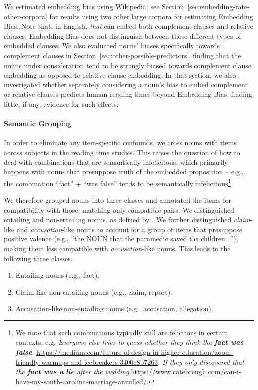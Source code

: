 We estimated embedding bias using Wikipedia; see Section~\ref{sec:embedding-rate-other-corpora} for results using two other large corpora for estimating Embedding Bias.
Note that, in English, \emph{that} can embed both complement clauses and relative clauses; Embedding Bias does not distinguish between those different types of embedded clauses.
We also evaluated nouns' biases specifically towards complement clauses in Section~\ref{sec:other-possible-predictors}, finding that the nouns under consideration tend to be strongly biased towards complement clause embedding as opposed to relative clause embedding.
In that section, we also investigated whether separately considering a noun's bias to embed complement or relative clauses predicts human reading times beyond Embedding Bias, finding little, if any, evidence for such effects.

\paragraph{Semantic Grouping}
In order to eliminate any item-specific confounds, we cross nouns with items across subjects in the reading time studies.
This raises the question of how to deal with combinations that are semantically infelicitous, which primarily happens with nouns that presuppose truth of the embedded proposition -- e.g., the combination ``fact'' + ``was false'' tends to be semantically infelicitous\footnote{We note that such combinations typically still are felicitous in certain contexts, e.g. \textit{Everyone else tries to guess whether they think the \textbf{fact was false}.} \url{https://medium.com/future-of-design-in-higher-education/zoom-friendly-warmups-and-icebreakers-3400c8b7263}; \textit{If they only discovered that the \textbf{fact was a lie} after the wedding} \url{https://www.catebrough.com/can-i-have-my-south-carolina-marriage-annulled/}.}

We therefore grouped nouns into three classes and annotated the items for compatibility with those, matching only compatible pairs.
We distinguished entailing and non-entailing nouns, as defined by \cite{huddleston2002the}. We further distinguished \textit{claim}-like and \textit{accusation}-like nouns to account for a group of items that presuppose positive valence (e.g., ``the NOUN that the paramedic saved the children...''), making them less compatible with \textit{accusation}-like nouns.
This leads to the following three classes.
\begin{enumerate}
	\item Entailing nouns  (e.g., fact).
    \item Claim-like non-entailing nouns (e.g., claim, report).
    \item Accusation-like non-entailing nouns (e.g., accusation, allegation).
\end{enumerate}

